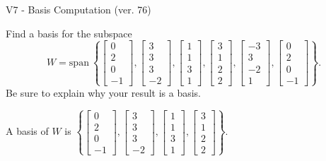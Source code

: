 \begin{exercise}
  \begin{exerciseTitle}V7 - Basis Computation (ver. 76)\end{exerciseTitle}
  \begin{exerciseStatement}
    Find a basis for the subspace 
\[W=\mathrm{span}\ \left\{\left[\begin{array}{r}
0 \\
2 \\
0 \\
-1
\end{array}\right] , \left[\begin{array}{r}
3 \\
3 \\
3 \\
-2
\end{array}\right] , \left[\begin{array}{r}
1 \\
1 \\
3 \\
1
\end{array}\right] , \left[\begin{array}{r}
3 \\
1 \\
2 \\
2
\end{array}\right] , \left[\begin{array}{r}
-3 \\
3 \\
-2 \\
1
\end{array}\right] , \left[\begin{array}{r}
0 \\
2 \\
0 \\
-1
\end{array}\right]\right\}.\]
 Be sure to explain why your result is a basis.


  \end{exerciseStatement}
  \begin{exerciseAnswer}
   A basis of \(W\) is  \(\left\{\left[\begin{array}{r}
0 \\
2 \\
0 \\
-1
\end{array}\right] , \left[\begin{array}{r}
3 \\
3 \\
3 \\
-2
\end{array}\right] , \left[\begin{array}{r}
1 \\
1 \\
3 \\
1
\end{array}\right] , \left[\begin{array}{r}
3 \\
1 \\
2 \\
2
\end{array}\right]\right\}\).
  


  \end{exerciseAnswer}
\end{exercise}